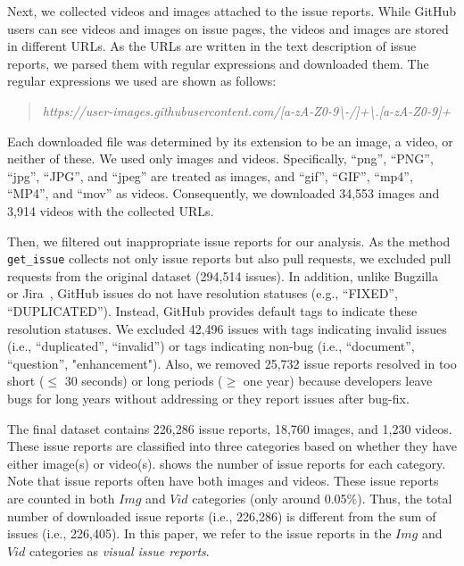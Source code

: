 Next, we collected videos and images attached to the issue reports. While GitHub users can see videos and images on issue pages, the videos and images are stored in different URLs. As the URLs are written in the text description of issue reports, we parsed them with regular expressions and downloaded them. The regular expressions we used are shown as follows:
\begin{quote}
\addtolength\leftmargini{0in}
{\it https://user-images.githubusercontent.com/[a-zA-Z0-9\textbackslash-/]+\textbackslash.[a-zA-Z0-9]+}
\end{quote}
Each downloaded file was determined by its extension to be an image, a video, or neither of these. We used only images and videos. Specifically, ``png'', ``PNG'', ``jpg'', ``JPG'', and ``jpeg'' are treated as images, and  ``gif'', ``GIF'', ``mp4'', ``MP4'', and ``mov'' as videos. 
Consequently, we downloaded 34,553 images and 3,914 videos with the collected URLs. 

Then, we filtered out inappropriate issue reports for our analysis. As the method \texttt{get\_issue} collects not only issue reports but also pull requests, we excluded pull requests from the original dataset (294,514 issues).  
In addition, unlike Bugzilla~\citep{Bugzilla} or Jira~\citep{JIRA}, GitHub issues do not have resolution statuses (e.g., ``FIXED'', ``DUPLICATED''). 
Instead,  GitHub provides default tags to indicate these resolution statuses. 
We excluded 42,496 issues with tags indicating invalid issues (i.e., ``duplicated'', ``invalid'') or tags indicating non-bug (i.e., ``document'', ``question'', "enhancement"). Also, we removed 25,732 issue reports resolved in too short ($\leq$ 30 seconds) or long periods  ($\geq$ one year) because developers leave bugs for long years without addressing or they report issues after bug-fix. 


 The final dataset contains 226,286 issue reports,  18,760 images, and 1,230 videos. 
These issue reports are classified into three categories based on whether they have either image(s) or video(s). 
 shows the number of issue reports for each category. 
Note that issue reports often have both images and videos. 
These issue reports are counted in both $Img$ and $Vid$ categories (only around 0.05\%). 
Thus, the total number of downloaded issue reports (i.e., 226,286) is different from the sum of issues (i.e., 226,405). 
In this paper, we refer to the issue reports in the $Img$ and $Vid$ categories
as \textit{visual issue reports}. 

